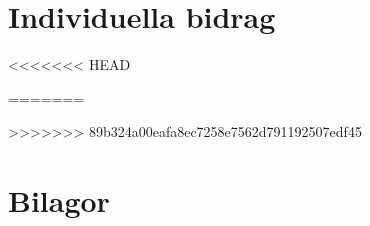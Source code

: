 \documentclass[a4paper,10pt]{report}
\begin{document}






\part{}








\part{Individuella bidrag}
\appendix








<<<<<<< HEAD


=======




>>>>>>> 89b324a00eafa8ec7258e7562d791192507edf45
\part{Bilagor}
\end{document}
